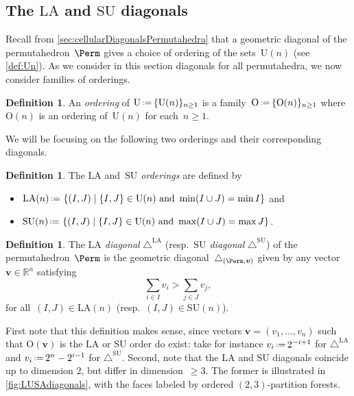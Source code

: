 \documentclass{amsart}
\newcommand{\darkblue}{\color{darkblue}} %
\theoremstyle{definition}
\newtheorem{definition}[theorem]{Definition}
\newcommand{\R}{\mathbb{R}} %
\renewcommand{\b}[1]{{\boldsymbol{#1}}} %
\newcommand{\Un}{\mathrm{U}} %
\newcommand{\Or}{\mathrm{O}} %
\newcommand{\set}[2]{\left\{ #1 \;\middle|\; #2 \right\}} %
\newcommand{\eqdef}{\mbox{\,\raisebox{0.2ex}{\scriptsize\ensuremath{\mathrm:}}\ensuremath{=}\,}} %
\newcommand{\resp}{resp.~} %
\newcommand{\defn}[1]{\textsl{\darkblue #1}} %
\renewcommand{\b}[1]{\boldsymbol{#1}} %
\newcommand{\SU}{\mathrm{SU}}
\newcommand{\LA}{\mathrm{LA}}
\newcommand{\SUD}{\triangle^{\mathrm{SU}}}
\newcommand{\LAD}{\triangle^{\mathrm{LA}}}
\begin{document}

\subsection{The $\LA$ and $\SU$ diagonals}
\label{subsec:LASUdiagonal}

Recall from \cref{sec:cellularDiagonalsPermutahedra} that a geometric diagonal of the permutahedron~$\Perm$ gives a choice of ordering of the sets~$\Un(n)$ (see \cref{def:Un}).
As we consider in this section diagonals for all permutahedra, we now consider families of orderings.

\begin{definition}
An \defn{ordering} of $\Un \eqdef \{\Un(n)\}_{n \ge 1}$ is a family~$\Or \eqdef \{\Or(n)\}_{n \ge 1}$ where~$\Or(n)$ is an ordering of~$\Un(n)$ for each~$n \ge 1$.
\end{definition}

We will be focusing on the following two orderings and their corresponding diagonals.

\begin{definition}
The \defn{$\LA$} and~\defn{$\SU$ orderings} are defined by
\begin{itemize} 
	\item $\LA(n) \eqdef \set{(I,J)}{\{I,J\} \in \Un(n) \text{ and } \min(I\cup J) = \min I}$ and
	\item $\SU(n) \eqdef \set{(I,J)}{\{I,J\} \in \Un(n) \text{ and } \max(I\cup J) = \max J}$.
\end{itemize}
\end{definition}

\begin{definition}
\label{def:LA-and-SU}
The \defn{$\LA$ diagonal} $\LAD$ (\resp \defn{$\SU$ diagonal} $\SUD$) of the permutahedron~$\Perm$ is the geometric diagonal~$\triangle_{(\Perm,\b{v})}$ given by any vector $\b{v} \in \R^n$ satisfying  
\[
\sum_{i \in I} v_i > \sum_{j \in J} v_j,
\]
for all~$(I,J) \in \LA(n)$ (\resp $(I,J) \in \SU(n)$).
\end{definition}

First note that this definition makes sense, since vectors $\b{v}=(v_1,\ldots,v_n)$ such that $\Or(\b{v})$ is the $\LA$ or $\SU$ order do exist: take for instance $v_i\eqdef 2^{-i+1}$ for $\LAD$ and $v_i \eqdef 2^n - 2^{i-1}$ for $\SUD$.
Second, note that the $\LA$ and $\SU$ diagonals coincide up to dimension $2$, but differ in dimension~$\ge 3$.
The former is illustrated in \cref{fig:LUSAdiagonals}, with the faces labeled by ordered $(2,3)$-partition forests.
\end{document}
